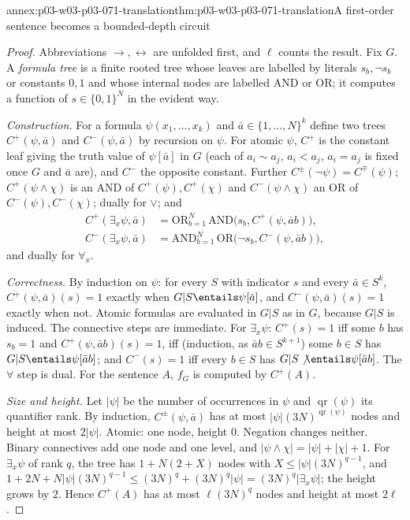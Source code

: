 \begin{annexitem}{annex:p03-w03-p03-071-translation}{thm:p03-w03-p03-071-translation}{A first-order sentence becomes a bounded-depth circuit}
\begin{proof}
Abbreviations \(\to,\leftrightarrow\) are unfolded first, and \(\ell\) counts
the result.  Fix \(G\).  A \emph{formula tree} is a finite rooted tree whose
leaves are labelled by literals \(s_b,\neg s_b\) or constants \(0,1\) and
whose internal nodes are labelled AND or OR; it computes a function of
\(s\in\{0,1\}^N\) in the evident way.

\emph{Construction.}  For a formula \(\psi(x_1,\ldots,x_k)\) and
\(\bar a\in\{1,\ldots,N\}^k\) define two trees \(C^+(\psi,\bar a)\) and
\(C^-(\psi,\bar a)\) by recursion on \(\psi\).  For atomic \(\psi\),
\(C^+\) is the constant leaf giving the truth value of \(\psi[\bar a]\) in
\(G\) (each of \(a_i\sim a_j\), \(a_i<a_j\), \(a_i=a_j\) is fixed once \(G\)
and \(\bar a\) are), and \(C^-\) the opposite constant.  Further
\(C^\pm(\neg\psi)=C^\mp(\psi)\); \(C^+(\psi\wedge\chi)\) is an AND of
\(C^+(\psi),C^+(\chi)\) and \(C^-(\psi\wedge\chi)\) an OR of
\(C^-(\psi),C^-(\chi)\); dually for \(\vee\); and
\begin{align*}
  C^+(\exists_x\psi,\bar a)&=\mathrm{OR}_{b=1}^{N}\,\mathrm{AND}\bigl(s_b,
     C^+(\psi,\bar ab)\bigr),\\
  C^-(\exists_x\psi,\bar a)&=\mathrm{AND}_{b=1}^{N}\,\mathrm{OR}\bigl(\neg s_b,
     C^-(\psi,\bar ab)\bigr),
\end{align*}
and dually for \(\forall_x\).

\emph{Correctness.}  By induction on \(\psi\): for every \(S\) with indicator
\(s\) and every \(\bar a\in S^k\), \(C^+(\psi,\bar a)(s)=1\) exactly when
\(G|S\entails\psi[\bar a]\), and \(C^-(\psi,\bar a)(s)=1\) exactly when not.
Atomic formulas are evaluated in \(G|S\) as in \(G\), because \(G|S\) is
induced.  The connective steps are immediate.  For \(\exists_x\psi\):
\(C^+(s)=1\) iff some \(b\) has \(s_b=1\) and \(C^+(\psi,\bar ab)(s)=1\),
iff (induction, as \(\bar ab\in S^{k+1}\)) some \(b\in S\) has
\(G|S\entails\psi[\bar ab]\); and \(C^-(s)=1\) iff every \(b\in S\) has
\(G|S\not\entails\psi[\bar ab]\).  The \(\forall\) step is dual.  For the
sentence \(A\), \(f_G\) is computed by \(C^+(A)\).

\emph{Size and height.}  Let \(\lvert\psi\rvert\) be the number of
occurrences in \(\psi\) and \(\operatorname{qr}(\psi)\) its quantifier rank.
By induction, \(C^\pm(\psi,\bar a)\) has at most
\(\lvert\psi\rvert(3N)^{\operatorname{qr}(\psi)}\) nodes and height at most
\(2\lvert\psi\rvert\).  Atomic: one node, height \(0\).  Negation changes
neither.  Binary connectives add one node and one level, and
\(\lvert\psi\wedge\chi\rvert=\lvert\psi\rvert+\lvert\chi\rvert+1\).  For
\(\exists_x\psi\) of rank \(q\), the tree has
\(1+N(2+X)\) nodes with \(X\leq\lvert\psi\rvert(3N)^{q-1}\), and
\(1+2N+N\lvert\psi\rvert(3N)^{q-1}\leq(3N)^q+(3N)^q\lvert\psi\rvert=
(3N)^q\lvert\exists_x\psi\rvert\); the height grows by \(2\).  Hence
\(C^+(A)\) has at most \(\ell(3N)^q\) nodes and height at most \(2\ell\).


\end{proof}
\end{annexitem}

